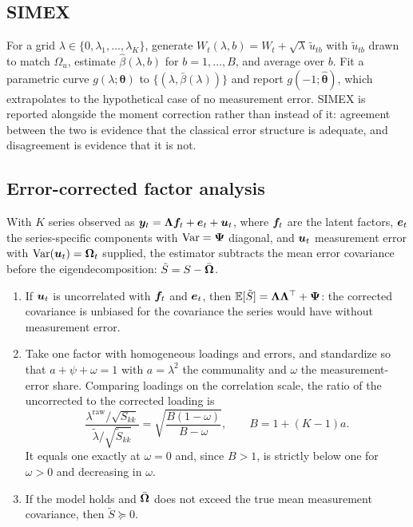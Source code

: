 \documentclass[12pt,a4paper,oneside]{article}
\begin{document}
\subsection{SIMEX}

For a grid $\lambda\in\{0,\lambda_1,\dots,\lambda_K\}$, generate
$W_t(\lambda,b)=W_t+\sqrt{\lambda}\,\tilde{u}_{tb}$ with
$\tilde{u}_{tb}$ drawn to match $\Omega_u$, estimate $\hat\beta(\lambda,b)$ for
$b=1,\dots,B$, and average over $b$. Fit a parametric curve
$g(\lambda;\bm{\theta})$ to $\{(\lambda,\bar{\beta}(\lambda))\}$ and report
$g(-1;\hat{\bm{\theta}})$, which extrapolates to the hypothetical case of no
measurement error. SIMEX is reported alongside the moment correction rather than
instead of it: agreement between the two is evidence that the classical error
structure is adequate, and disagreement is evidence that it is not.

\subsection{Error-corrected factor analysis}\label{app:factor}

With $K$ series observed as $\bm{y}_t=\bm{\Lambda} \bm{f}_t+\bm{e}_t+\bm{u}_t$, where $\bm{f}_t$
are the latent factors, $\bm{e}_t$ the series-specific components with
$\operatorname{Var}=\bm{\Psi}$ diagonal, and $\bm{u}_t$ measurement error with $\operatorname{Var}(\bm{u}_t)=\bm{\Omega}_t$
supplied, the estimator subtracts the mean error covariance before the
eigendecomposition: $\tilde{S}=S-\bar{\bm{\Omega}}$.

\begin{proposition}\label{prop:factor}
\begin{enumerate}
\item If $\bm{u}_t$ is uncorrelated with $\bm{f}_t$ and $\bm{e}_t$, then
$\mathbb{E}[\tilde{S}]=\bm{\Lambda}\bm{\Lambda}^\top+\bm{\Psi}$: the corrected covariance is unbiased for the
covariance the series would have without measurement error.
\item Take one factor with homogeneous loadings and errors, and standardize so
that $a+\psi+\omega=1$ with $a=\lambda^2$ the communality and $\omega$ the
measurement-error share. Comparing loadings on the correlation scale, the ratio of
the uncorrected to the corrected loading is
\begin{equation}
\frac{\lambda^{\mathrm{raw}}/\sqrt{S_{kk}}}{\tilde{\lambda}/\sqrt{\tilde{S}_{kk}}}
=\sqrt{\frac{B(1-\omega)}{B-\omega}},
\qquad B=1+(K-1)a .
\label{eq:attenuation}
\end{equation}
It equals one exactly at $\omega=0$ and, since $B>1$, is strictly below one for
$\omega>0$ and decreasing in $\omega$.
\item If the model holds and $\bar{\bm{\Omega}}$ does not exceed the true mean measurement
covariance, then $\tilde{S}\succeq0$.
\end{enumerate}
\end{proposition}
\end{document}
